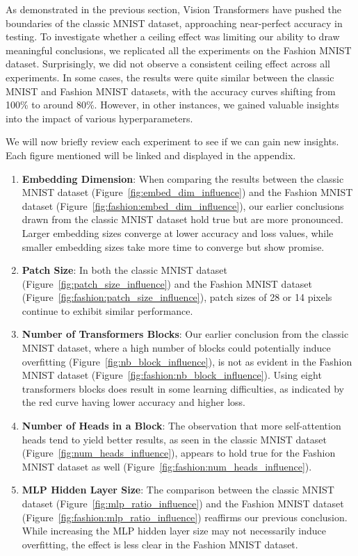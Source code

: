 As demonstrated in the previous section, Vision Transformers have pushed the boundaries of the classic MNIST dataset, approaching near-perfect accuracy in testing. To investigate whether a ceiling effect was limiting our ability to draw meaningful conclusions, we replicated all the experiments on the Fashion MNIST dataset. Surprisingly, we did not observe a consistent ceiling effect across all experiments. In some cases, the results were quite similar between the classic MNIST and Fashion MNIST datasets, with the accuracy curves shifting from 100\% to around 80\%. However, in other instances, we gained valuable insights into the impact of various hyperparameters.

We will now briefly review each experiment to see if we can gain new insights. Each figure mentioned will be linked and displayed in the appendix.
\begin{enumerate}
    \item \textbf{Embedding Dimension}: When comparing the results between the classic MNIST dataset (Figure~\ref{fig:embed_dim_influence}) and the Fashion MNIST dataset (Figure~\ref{fig:fashion:embed_dim_influence}), our earlier conclusions drawn from the classic MNIST dataset hold true but are more pronounced. Larger embedding sizes converge at lower accuracy and loss values, while smaller embedding sizes take more time to converge but show promise.

    \item \textbf{Patch Size}: In both the classic MNIST dataset (Figure~\ref{fig:patch_size_influence}) and the Fashion MNIST dataset (Figure~\ref{fig:fashion:patch_size_influence}), patch sizes of 28 or 14 pixels continue to exhibit similar performance.

    \item \textbf{Number of Transformers Blocks}: Our earlier conclusion from the classic MNIST dataset, where a high number of blocks could potentially induce overfitting (Figure~\ref{fig:nb_block_influence}), is not as evident in the Fashion MNIST dataset (Figure~\ref{fig:fashion:nb_block_influence}). Using eight transformers blocks does result in some learning difficulties, as indicated by the red curve having lower accuracy and higher loss.

    \item \textbf{Number of Heads in a Block}: The observation that more self-attention heads tend to yield better results, as seen in the classic MNIST dataset (Figure~\ref{fig:num_heads_influence}), appears to hold true for the Fashion MNIST dataset as well (Figure~\ref{fig:fashion:num_heads_influence}).

    \item \textbf{MLP Hidden Layer Size}: The comparison between the classic MNIST dataset (Figure~\ref{fig:mlp_ratio_influence}) and the Fashion MNIST dataset (Figure~\ref{fig:fashion:mlp_ratio_influence}) reaffirms our previous conclusion. While increasing the MLP hidden layer size may not necessarily induce overfitting, the effect is less clear in the Fashion MNIST dataset.
\end{enumerate}
